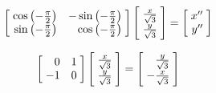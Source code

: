 \documentclass[a4paper]{article}
\begin{document}
\begin{enumerate}[label=\textbf{\arabic*.}]
\begin{enumerate}
		\begin{equation*}
		\begin{bmatrix*}[r]
			\hspace{1mm} \cos{\left(-\frac{\pi}{2}\right)} & -\sin{\left(-\frac{\pi}{2}\right)} \hspace{1mm}\\
			\hspace{1mm} \sin{\left(-\frac{\pi}{2}\right)} & \cos{\left(-\frac{\pi}{2}\right)} \hspace{1mm}\\
		\end{bmatrix*}
		\begin{bmatrix*}[r]
			\hspace{1mm} \frac{x}{\sqrt{3}} \hspace{1mm}\\
			\hspace{1mm} \frac{y}{\sqrt{3}} \hspace{1mm}\\
		\end{bmatrix*}
		=
		\begin{bmatrix*}[r]
			\hspace{1mm} x^{\prime \prime} \hspace{1mm}\\
			\hspace{1mm} y^{\prime \prime} \hspace{1mm}\\
		\end{bmatrix*}
		\end{equation*}

		\begin{equation*}
		\begin{bmatrix*}[r]
			\hspace{1mm} 0 & 1 \hspace{1mm}\\
			\hspace{1mm} -1 & 0 \hspace{1mm}\\
		\end{bmatrix*}
		\begin{bmatrix*}[r]
			\hspace{1mm} \frac{x}{\sqrt{3}} \hspace{1mm}\\
			\hspace{1mm} \frac{y}{\sqrt{3}} \hspace{1mm}\\
		\end{bmatrix*}
		=
		\begin{bmatrix*}[r]
			\hspace{1mm} \frac{y}{\sqrt{3}} \hspace{1mm}\\
			\hspace{1mm} -\frac{x}{\sqrt{3}} \hspace{1mm}\\
		\end{bmatrix*}
		\end{equation*}


\end{enumerate}
\end{enumerate}
\end{document}

